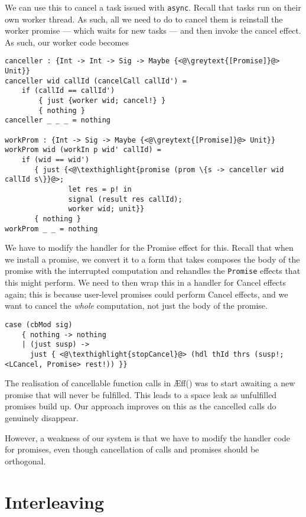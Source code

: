 \documentclass[msc,deptreport,cs]{infthesis} %
\newcommand{\code}[1]{\lstinline{#1}}
\newcommand{\texthighlight}[1]{%
  \colorbox{red!20}{#1}}
\newcommand{\greytext}[1]{\textcolor{black!40}{#1}}
\newcommand\aeff{{\AE}ff\xspace}
\begin{document}
We can use this to cancel a task issued with \code{async}. Recall that tasks run
on their own worker thread. As such, all we need to do to cancel them is
reinstall the worker promise --- which waits for new tasks --- and then invoke
the cancel effect. As such, our worker code becomes

\begin{lstlisting}
canceller : {Int -> Int -> Sig -> Maybe {<@\greytext{[Promise]}@> Unit}}
canceller wid callId (cancelCall callId') =
    if (callId == callId')
        { just {worker wid; cancel!} }
        { nothing }
canceller _ _ _ = nothing

workProm : {Int -> Sig -> Maybe {<@\greytext{[Promise]}@> Unit}}
workProm wid (workIn p wid' callId) =
    if (wid == wid')
       { just {<@\texthighlight{promise (prom \{s -> canceller wid callId s\}}@>;
               let res = p! in
               signal (result res callId);
               worker wid; unit}}
       { nothing }
workProm _ _ = nothing
\end{lstlisting}

We have to modify the handler for the \textsf{Promise} effect for this. Recall
that when we install a promise, we convert it to a form that takes composes the
body of the promise with the interrupted computation and rehandles the
\code{Promise} effects that this might perform.
%
We need to then wrap this in a handler for \textsf{Cancel} effects again; this
is because user-level promises could perform \textsf{Cancel} effects, and we
want to cancel the \emph{whole} computation, not just the body of the promise.

\begin{lstlisting}
case (cbMod sig)
    { nothing -> nothing
    | (just susp) ->
      just { <@\texthighlight{stopCancel}@> (hdl thId thrs (susp!; <LCancel, Promise> rest!)) }}
\end{lstlisting}

The realisation of cancellable function calls in
\aeff(\cite{ahman2020asynchronous}) was to start awaiting a new promise that
will never be fulfilled. This leads to a space leak as unfulfilled promises
build up. Our approach improves on this as the cancelled calls do genuinely
disappear.

However, a weakness of our system is that we have to modify the handler code for
promises, even though cancellation of calls and promises should be orthogonal.

\section{Interleaving}
\end{document}
